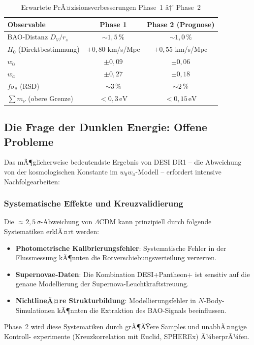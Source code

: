 ﻿\documentclass[a4paper,12pt]{article}
\theoremstyle{definition}
\theoremstyle{remark}
\begin{document}
\begin{table}[H]
  \centering
  \caption{Erwartete PrÃ¤zisionsverbesserungen Phase~1 â†’ Phase~2}
  \label{tab:precision}
  \begin{tabular}{lcc}
    \toprule
    \textbf{Observable} & \textbf{Phase 1} & \textbf{Phase 2 (Prognose)} \\
    \midrule
    BAO-Distanz $D_V/r_s$ & $\sim 1{,}5\,\%$ & $\sim 1{,}0\,\%$ \\
    $H_0$ (Direktbestimmung) & $\pm 0{,}80$ km/s/Mpc & $\pm 0{,}55$ km/s/Mpc \\
    $w_0$ & $\pm 0{,}09$ & $\pm 0{,}06$ \\
    $w_a$ & $\pm 0{,}27$ & $\pm 0{,}18$ \\
    $f\sigma_8$ (RSD) & $\sim 3\,\%$ & $\sim 2\,\%$ \\
    $\sum m_\nu$ (obere Grenze) & $< 0{,}3\,\mathrm{eV}$ & $< 0{,}15\,\mathrm{eV}$ \\
    \bottomrule
  \end{tabular}
\end{table}

\subsection{Die Frage der Dunklen Energie: Offene Probleme}

Das mÃ¶glicherweise bedeutendste Ergebnis von DESI DR1 -- die Abweichung von der
kosmologischen Konstante im $w_0 w_a$-Modell -- erfordert intensive Nachfolgearbeiten:

\subsubsection*{Systematische Effekte und Kreuzvalidierung}
Die $\approx 2{,}5\,\sigma$-Abweichung von $\Lambda$CDM kann prinzipiell durch
folgende Systematiken erklÃ¤rt werden:
\begin{itemize}
  \item \textbf{Photometrische Kalibrierungsfehler}: Systematische Fehler in
    der Flussmessung kÃ¶nnten die Rotverschiebungsverteilung verzerren.
  \item \textbf{Supernovae-Daten}: Die Kombination DESI+Pantheon+ ist sensitiv
    auf die genaue Modellierung der Supernova-Leuchtkraftstreuung.
  \item \textbf{NichtlineÃ¤re Strukturbildung}: Modellierungsfehler in
    $N$-Body-Simulationen kÃ¶nnten die Extraktion des BAO-Signals beeinflussen.
\end{itemize}
Phase~2 wird diese Systematiken durch grÃ¶ÃŸere Samples und unabhÃ¤ngige Kontroll-
experimente (Kreuzkorrelation mit Euclid, SPHEREx) Ã¼berprÃ¼fen.
\end{document}
